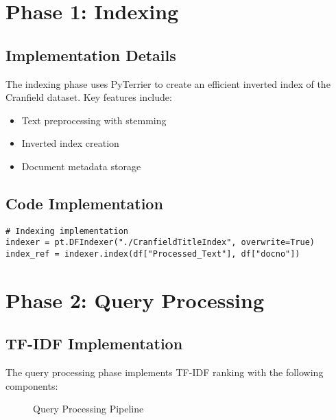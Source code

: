 \documentclass[12pt,a4paper]{article}
\begin{document}
\section{Phase 1: Indexing}
\subsection{Implementation Details}
The indexing phase uses PyTerrier to create an efficient inverted index of the Cranfield dataset. Key features include:

\begin{itemize}
    \item Text preprocessing with stemming
    \item Inverted index creation
    \item Document metadata storage
\end{itemize}

\subsection{Code Implementation}
\begin{verbatim}
# Indexing implementation
indexer = pt.DFIndexer("./CranfieldTitleIndex", overwrite=True)
index_ref = indexer.index(df["Processed_Text"], df["docno"])
\end{verbatim}

\section{Phase 2: Query Processing}
\subsection{TF-IDF Implementation}
The query processing phase implements TF-IDF ranking with the following components:

\begin{figure}[H]
    \centering
    \caption{Query Processing Pipeline}
\end{figure}
\end{document}

